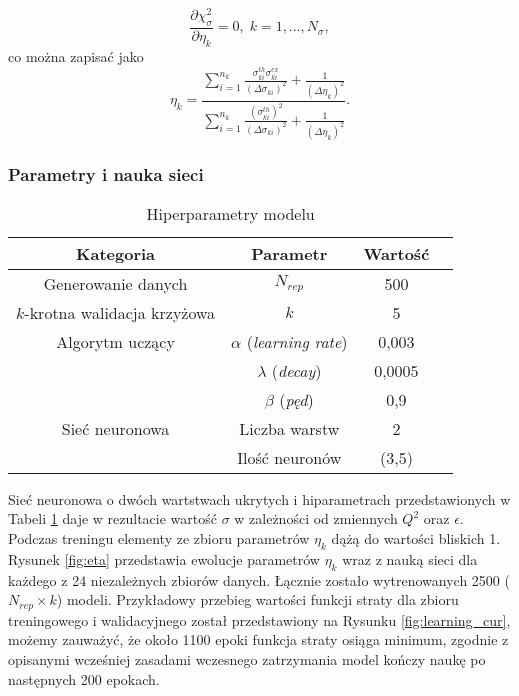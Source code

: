 \documentclass[11pt]{book}
\theoremstyle{definition}
\begin{document}
%
\begin{equation}
\frac{\partial \chi_{\sigma}^2}{\partial \eta_k} = 0, \; k = 1,\dots,N_{\sigma}, \label{eq_eta1}
\end{equation}
co można zapisać jako
%
\begin{equation}
\eta_k = \frac{\sum_{i=1}^{n_k}\frac{\sigma_{ki}^{th} \sigma_{ki}^{ex}}{\left(\Delta \sigma_{ki}\right)^2} + \frac{1}{\left(\Delta \eta_k\right)^2}}{\sum_{i=1}^{n_k}\frac{\left(\sigma_{ki}^{th}\right)^2}{\left(\Delta \sigma_{ki}\right)^2} + \frac{1}{\left(\Delta \eta_k\right)^2}}. \label{eq_eta2}
\end{equation}


\subsubsection{Parametry i nauka sieci}


\begin{table}
	\centering
	\caption{Hiperparametry modelu}\label{tab:hyper1} 
	\begin{tabular}{c|c c c}
		\hline 
		Kategoria & Parametr & Wartość &   \\\hline
		Generowanie danych & $N_{rep}$ & 500 & \\ \hline
		$k$-krotna walidacja krzyżowa & $k$ & 5 &\\ \hline
		
		Algorytm uczący& $\alpha$ (\textit{learning rate}) & 0,003 & \\
		& $\lambda$ (\textit{decay}) & 0,0005 & \\ 
		& $\beta$ (\textit{pęd}) & 0,9 & \\ \hline
		Sieć neuronowa & Liczba warstw & 2 & \\ 
		& Ilość neuronów & (3,5) & \\ \hline
		
	\end{tabular}
\end{table}

Sieć neuronowa o dwóch wartstwach ukrytych i hiparametrach przedstawionych w Tabeli \ref{tab:hyper1} daje w rezultacie wartość $\sigma$ w zależności od zmiennych $Q^2$ oraz $\epsilon$. Podczas treningu elementy ze zbioru parametrów $\eta_k$ dążą do wartości bliskich 1. %
Rysunek \ref{fig:eta} przedstawia ewolucje parametrów $\eta_k$ wraz z nauką sieci dla każdego z 24 niezależnych zbiorów danych. Łącznie zostało wytrenowanych 2500 ($N_{rep} \times k$) modeli. Przykładowy przebieg wartości funkcji straty dla zbioru treningowego i walidacyjnego został przedstawiony na Rysunku \ref{fig:learning_cur}, możemy zauważyć, że około 1100 epoki funkcja straty osiąga minimum, zgodnie z opisanymi wcześniej zasadami wczesnego zatrzymania model kończy naukę po następnych 200 epokach. 
\end{document}
